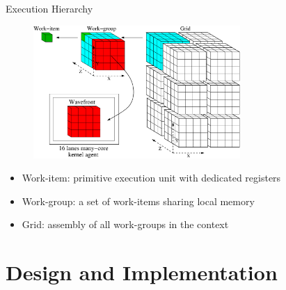 \documentclass{beamer}
\begin{document}
\begin{CJK}{UTF8}{bkai}
            \begin{frame}{Execution Hierarchy}
                \begin{figure}[t] 
                    \centering
                    \includegraphics[width=0.7\textwidth]{./figs/grid.eps}
                    \label{fig:grid}
                \end{figure}%
                \begin{itemize}
                    \item <2-> {Work-item: primitive execution unit with dedicated registers}
                    \item <3-> {Work-group: a set of work-items sharing local memory}
                    \item <4-> {Grid: assembly of all work-groups in the context}
                \end{itemize}
            \end{frame}



            \section{Design and Implementation}


\end{CJK}
\end{document}
